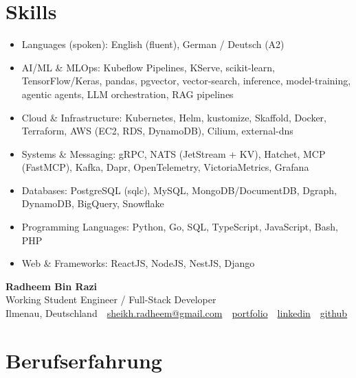 \documentclass[10pt,a4paper]{resume}
\makeatletter
\newcommand{\Portfolio}{https://radheem.github.io/my-cv}
\newcommand{\PortfolioText}{portfolio}
\newcommand{\GitHub}{https://github.com/radheem}
\newcommand{\LinkedIn}{https://www.linkedin.com/in/radheem-razi}
\newcommand{\Email}{sheikh.radheem@gmail.com}
\makeatother
\begin{document}
\section{Skills}

\begin{itemize}[leftmargin=1.4em,nosep,topsep=2pt]
  \item Languages (spoken): English (fluent), German / Deutsch (A2)
  \item AI/ML \& MLOps: Kubeflow Pipelines, KServe, scikit-learn, TensorFlow/Keras, pandas, pgvector, vector-search, inference, model-training, agentic agents, LLM orchestration, RAG pipelines
  \item Cloud \& Infrastructure: Kubernetes, Helm, kustomize, Skaffold, Docker, Terraform, AWS (EC2, RDS, DynamoDB), Cilium, external-dns
  \item Systems \& Messaging: gRPC, NATS (JetStream + KV), Hatchet, MCP (FastMCP), Kafka, Dapr, OpenTelemetry, VictoriaMetrics, Grafana
  \item Databases: PostgreSQL (sqlc), MySQL, MongoDB/DocumentDB, Dgraph, DynamoDB, BigQuery, Snowflake
  \item Programming Languages: Python, Go, SQL, TypeScript, JavaScript, Bash, PHP
  \item Web \& Frameworks: ReactJS, NodeJS, NestJS, Django
\end{itemize}

\clearpage
{}

\begin{center}
  {\huge\bfseries Radheem Bin Razi}\\[3pt]
  {\large Working Student Engineer / Full-Stack Developer}\\[6pt]
  \small
  Ilmenau, Deutschland \,\textbar\,
  \href{mailto:\Email}{\Email} \,\textbar\,
  \href{\Portfolio}{\PortfolioText} \,\textbar\,
  \href{\LinkedIn}{linkedin} \,\textbar\,
  \href{\GitHub}{github}
\end{center}
\vspace{2pt}

\section{Berufserfahrung}
\end{document}
